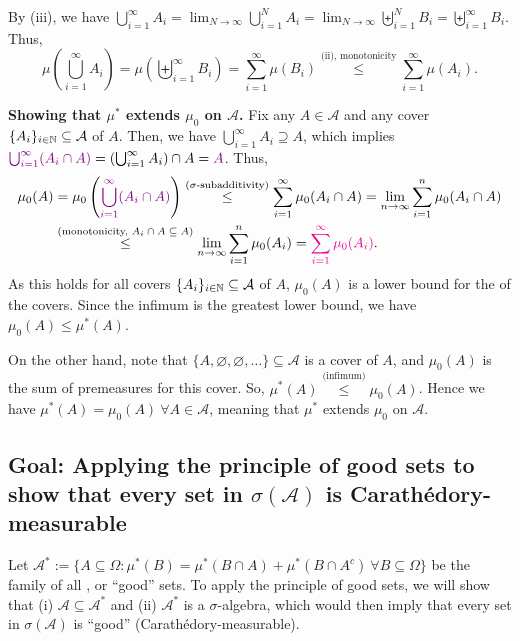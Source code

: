 \begin{enumerate}
\begin{pf}
\begin{itemize}
By (iii), we have \(\bigcup_{i=1}^{\infty}A_i
=\lim_{N\to\infty}\bigcup_{i=1}^{N}A_i =\lim_{N\to\infty}\biguplus_{i=1}^{N}B_i
=\biguplus_{i=1}^{\infty}B_i \). Thus,
\[
\mu\left(\bigcup_{i=1}^{\infty}A_i\right)
=\mu\left(\biguplus_{i=1}^{\infty}B_i\right)
=\sum_{i=1}^{\infty}\mu(B_i)
\overset{\text{(ii), monotonicity}}{\le}\sum_{i=1}^{\infty}\mu(A_i).
\]
\end{itemize}
\textbf{Showing that \(\mu^*\) extends \(\mu_0\) on \(\mathcal{A}\).} Fix any
\(A\in\mathcal{A}\) and any cover \(\{A_{i}\}_{i\in\mathbb{N}}\subseteq \mathcal{A}\)
of \(A\). Then, we have \(\bigcup_{i=1}^{\infty}A_i\supseteq A\), which implies
\({\color{violet}\bigcup_{i=1}^{\infty}(A_i\cap A)}=\left(\bigcup_{i=1}^{\infty}A_i\right)\cap A={\color{violet}A}\). Thus,
\begin{align*}
\mu_0(A)&=\mu_0\left({\color{violet}\bigcup_{i=1}^{\infty}(A_i\cap A)}\right)
\overset{\text{(\(\sigma\)-subadditivity)}}{\le}
\sum_{i=1}^{\infty}\mu_0(A_i\cap A)
=\lim_{n\to\infty}\sum_{i=1}^{n}\mu_0(A_i\cap A) \\
&\overset{\text{(monotonicity, \(A_i\cap A\subseteq A\))}}{\le}
\lim_{n\to\infty}\sum_{i=1}^{n}\mu_0(A_i)
={\color{magenta}\sum_{i=1}^{\infty}\mu_0(A_i)}.
\end{align*}
As this holds for all covers \(\{A_{i}\}_{i\in\mathbb{N}}\subseteq \mathcal{A}\) of
\(A\), \(\mu_0(A)\) is a lower bound for the  of the covers.
Since the infimum is the greatest lower bound, we have
\(\mu_0(A)\le\mu^*(A)\).

On the other hand, note that \(\{A,\varnothing,\varnothing,\dotsc\}\subseteq
\mathcal{A}\) is a cover of \(A\), and \(\mu_0(A)\) is the sum of premeasures
for this cover. So, \(\mu^*(A)\overset{\text{(infimum)}}{\le}\mu_0(A)\). Hence
we have \(\mu^*(A)=\mu_0(A)~\forall A\in\mathcal{A}\), meaning that \(\mu^*\)
extends \(\mu_0\) on \(\mathcal{A}\).

\subsection*{Goal: Applying the principle of good sets to show that every set in
\(\sigma(\mathcal{A})\) is Carath\'edory-measurable}
Let \(\mathcal{A^*}:=\{A\subseteq \Omega:\mu^*(B)=\mu^*(B\cap A)+\mu^*(B\cap
A^c)~\forall B\subseteq \Omega\}\) be the family of all
, or ``good'' sets. To apply the principle
of good sets, we will show that (i) \(\mathcal{A}\subseteq \mathcal{A}^*\) and
(ii) \(\mathcal{A}^*\) is a \(\sigma\)-algebra, which would then imply that
every set in \(\sigma(\mathcal{A})\) is ``good'' (Carath\'edory-measurable).


\end{pf}
\end{enumerate}
